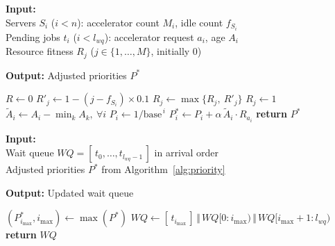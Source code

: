 \documentclass{ieeetj}
\begin{document}
\begin{algorithm}
\caption{SAFA adjusted priority}\label{alg:priority}
\textbf{Input:} \\
\hspace*{4mm} Servers $S_i$ ($i{<}n$): accelerator count $M_i$, idle count $f_{S_i}$ \\
\hspace*{4mm} Pending jobs $t_i$ ($i{<}l_{wq}$): accelerator request $a_i$, age $A_i$ \\
\hspace*{4mm} Resource fitness $R_j$ ($j\in\{1,\ldots,M\}$, initially 0)
\begin{flushleft}
\textbf{Output:} Adjusted priorities $P^*$
\end{flushleft}
\begin{algorithmic}[1]
\STATE $R \gets 0$
\STATE {}
            \STATE $R'_j \gets 1 - ( j - f_{S_i} ) \times 0.1$ 
            \STATE $R_j \gets \max\{R_j,\ R'_j\}$
        \ELSE
            \STATE $R_j \gets 1$ 
        \ENDIF
    \ENDFOR
\ENDFOR
\STATE {}
\STATE $\tilde A_i \gets A_i - \min_k A_k,\ \forall i$ 
    \STATE $P_i \gets 1/\text{base}^{\,i}$
    \STATE $P_i^* \gets P_i + \alpha\, \tilde A_i \cdot R_{a_i}$
\ENDFOR
\STATE \textbf{return} $P^*$
\end{algorithmic}
\end{algorithm}

\begin{algorithm}
\caption{SAFA queue reordering}\label{alg:reorder}
\textbf{Input:} \\
\hspace*{4mm} Wait queue $WQ=[\,t_0,\ldots,t_{l_{wq}-1}\,]$ in arrival order \\
\hspace*{4mm} Adjusted priorities $P^*$ from Algorithm~\ref{alg:priority}
\begin{flushleft}
\textbf{Output:} Updated wait queue
\end{flushleft}
\begin{algorithmic}[1]
\STATE $(P_{i_{\max}}^*, i_{\max}) \gets \max(P^*)$
    \STATE $WQ \gets [\,t_{i_{\max}}\,] \,\Vert\, WQ[0{:}i_{\max}) \,\Vert\, WQ[i_{\max}{+}1{:}l_{wq})$ 
\ENDIF
\STATE \textbf{return} $WQ$
\end{algorithmic}
\end{algorithm}
\end{document}
